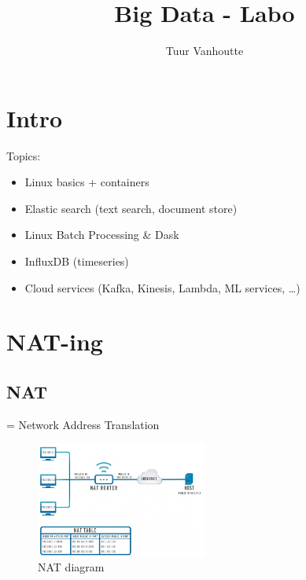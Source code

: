 \documentclass{article}
\begin{document}
\begin{titlepage}
    \author{Tuur Vanhoutte}
    \title{Big Data - Labo}
\end{titlepage}

\maketitle
\newpage
\tableofcontents
\newpage


\section{Intro}

Topics:

\begin{itemize}
    \item Linux basics + containers
    \item Elastic search (text search, document store)
    \item Linux Batch Processing \& Dask
    \item InfluxDB (timeseries)
    \item Cloud services (Kafka, Kinesis, Lambda, ML services, \dots)
\end{itemize}

\section{NAT-ing}

\subsection{NAT}

= Network Address Translation

\begin{figure}[H]
    \centering
    \includegraphics[width=0.5\textwidth]{nat.png}
    \caption{NAT diagram}
\end{figure}
\end{document}

